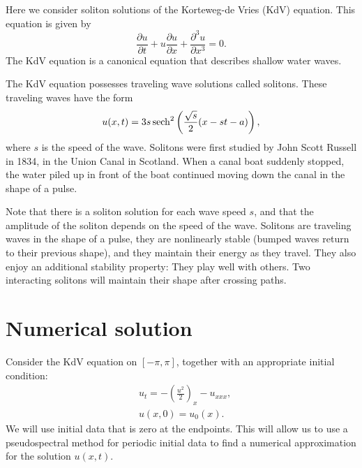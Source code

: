 \label{lab:solitons}



Here we consider soliton solutions of the Korteweg-de Vries (KdV) equation. This equation is given by 
\[  \frac{\partial u }{\partial t} + u \frac{\partial u}{\partial x} + \frac{\partial^3 u}{\partial x^3} = 0.
\]
The KdV equation is a canonical equation that describes shallow water waves. 

The KdV equation possesses traveling wave solutions called solitons.  
These traveling waves have the form 
\[ u(x,t) = 3s \operatorname{sech}^2\left(\frac{\sqrt{s}}{2}(x - st - a)\right),
\]
where $s$ is the speed of the wave. 
Solitons were first studied by John Scott Russell in 1834, in the Union Canal in Scotland. 
When a canal boat suddenly stopped, the water piled up in front of the boat continued moving down the canal in the shape of a pulse.  

Note that there is a soliton solution for each wave speed $s$, and that the amplitude of the soliton depends on the speed of the wave. 
Solitons are traveling waves in the shape of a pulse, they are nonlinearly stable (bumped waves return to their previous shape), and they maintain their energy as they travel. 
They also enjoy an additional stability property: They play well with others. 
Two interacting solitons will maintain their shape after crossing paths. 


\section*{Numerical solution}
Consider the KdV equation on $[-\pi,\pi]$, together with an appropriate initial condition: 
\begin{align*}
	 &{ }u_t = -\left(\frac{u^2}{2} \right)_x - u_{xxx},\\
     &{ }u(x,0) = u_0(x).
\end{align*}
We will use initial data that is zero at the endpoints. This will allow us to use a pseudospectral method for periodic initial data to find a numerical approximation for the solution $u(x,t)$. 

